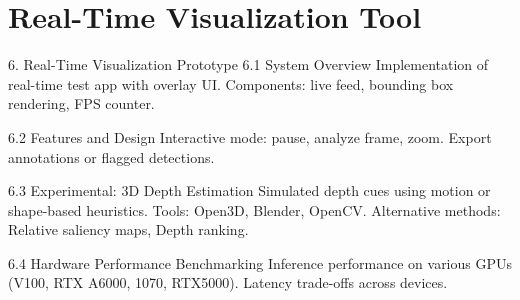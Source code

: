 \section{Real-Time Visualization Tool}
\label{sec:tool}

6. Real-Time Visualization Prototype
    6.1 System Overview
        Implementation of real-time test app with overlay UI.
        Components: live feed, bounding box rendering, FPS counter.

    6.2 Features and Design
        Interactive mode: pause, analyze frame, zoom.
        Export annotations or flagged detections.

    6.3 Experimental: 3D Depth Estimation
        Simulated depth cues using motion or shape-based heuristics.
        Tools: Open3D, Blender, OpenCV.
        Alternative methods: Relative saliency maps, Depth ranking.

    6.4 Hardware Performance Benchmarking
        Inference performance on various GPUs (V100, RTX A6000, 1070, RTX5000).
        Latency trade-offs across devices.
